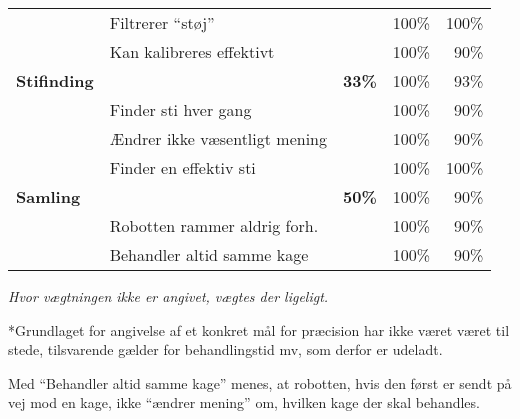 \begin{footnotesize}
\begin{center}
\begin{tabular}{l | l | r r r}
	& Filtrerer "`støj"' & & 100\% & 100\% \\
	& Kan kalibreres effektivt & & 100\% & 90\% \\
	\hspace*{0.3cm}\hspace*{0.3cm} \textbf{Stifinding}
																&		&	\textbf{33\%} & 	100\% & 93\% \\
	& Finder sti hver gang & & 100\% & 90\% \\
	& Ændrer ikke væsentligt mening & & 100\% & 90\% \\
	& Finder en effektiv sti & & 100\% & 100\% \\
	\hspace*{0.3cm} \textbf{Samling}
																&		&\textbf{50\%}		& 	100\%	& 90\% \\
	& Robotten rammer aldrig forh. & & 100\% & 90\% \\
	& Behandler altid samme kage & & 100\% & 90\%
\end{tabular}
\end{center}
\end{footnotesize}
\textit{Hvor vægtningen ikke er angivet, vægtes der ligeligt.}

*Grundlaget for angivelse af et konkret mål for præcision har ikke været  været til stede, tilsvarende gælder for behandlingstid mv, som derfor er udeladt.

Med "`Behandler altid samme kage"' menes, at robotten, hvis den først er sendt på vej mod en kage, ikke "`ændrer mening"' om, hvilken kage der skal behandles.